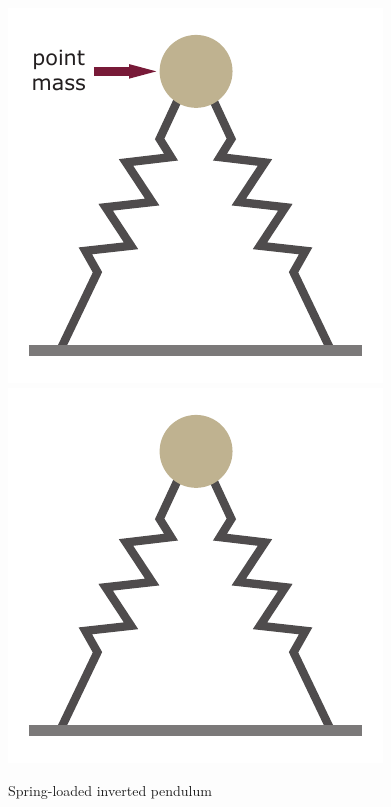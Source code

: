 \begin{frame}
\begin{columns}
\begin{column}{0.35\textwidth}
\begin{figure}
\begin{overprint}
			\includegraphics[width=.9\textwidth]{double_SLIP_mass.pdf}
			\onslide<4->\includegraphics[width=.9\textwidth]{double_SLIP.pdf}		
		\end{overprint}			
		\caption{Spring-loaded inverted pendulum}
	\end{figure}
	\end{column}
	\begin{column}{0.65\textwidth}

\end{column}
\end{columns}
\end{frame}
